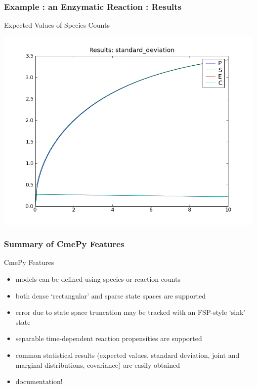 \documentclass[hyperref={colorlinks=true}]{beamer}
\begin{document}
\begin{frame}
\frametitle{Example : an Enzymatic Reaction : Results}
\begin{block}{Expected Values of Species Counts}
\begin{center}
\includegraphics[height=0.75\textheight]{results_std_dev.png}
\end{center}
\end{block}
\end{frame}

\begin{frame}
\frametitle{Summary of CmePy Features}
\begin{block}{CmePy Features}
\begin{itemize}
\item models can be defined using species or reaction counts
\item both dense `rectangular' and sparse state spaces are supported
\item error due to state space truncation may be tracked with an FSP-style
`sink' state
\item separable time-dependent reaction propensities are supported
\item common statistical results (expected values, standard deviation,
joint and marginal distributions, covariance) are easily obtained
\item documentation!
\end{itemize}
\end{block}
\end{frame}
\end{document}
